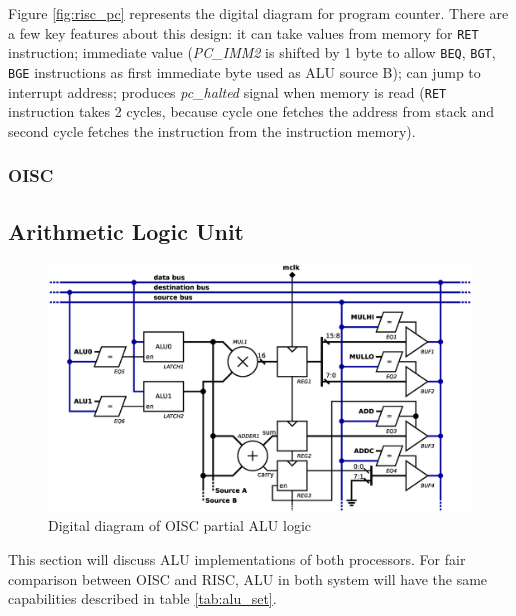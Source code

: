 Figure \ref{fig:risc_pc} represents the digital diagram for program counter. There are a few key features about this design: it can take values from memory for \texttt{RET} instruction; immediate value (\textit{PC\_IMM2} is shifted by 1 byte to allow \texttt{BEQ}, \texttt{BGT}, \texttt{BGE} instructions as first immediate byte used as ALU source B); can jump to interrupt address; produces \textit{pc\_halted} signal when memory is read (\texttt{RET} instruction takes 2 cycles, because cycle one fetches the address from stack and second cycle fetches the instruction from the instruction memory).

\subsubsection{OISC}

\subsection{Arithmetic Logic Unit}\label{subsec:alu}

\begin{figure}[b]
\centering
\includegraphics[scale=0.35]{../resources/oisc_alu.eps}
\caption{Digital diagram of OISC partial ALU logic}
\label{fig:oisc_alu}
\end{figure}

This section will discuss ALU implementations of both processors. For fair comparison between OISC and RISC, ALU in both system will have the same capabilities described in table \ref{tab:alu_set}.

